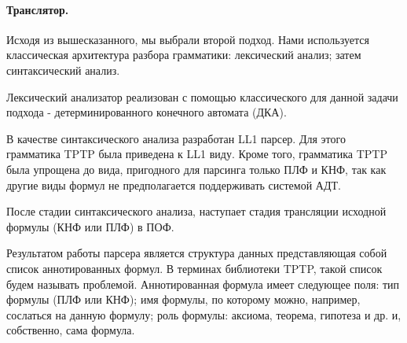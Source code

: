 \documentclass[a4paper]{jctart15b}
\begin{document}
\paragraph{Транслятор.}
Исходя из вышесказанного, мы выбрали второй подход. Нами используется классическая архитектура разбора грамматики: лексический анализ; затем синтаксический анализ. 

Лексический анализатор реализован с помощью классического для данной задачи подхода - детерминированного конечного автомата (ДКА).

В качестве синтаксического анализа разработан LL1 парсер. Для этого грамматика TPTP была приведена к LL1 виду. Кроме того, грамматика TPTP была упрощена до вида, пригодного для парсинга только ПЛФ и КНФ, так как другие виды формул не предполагается поддерживать системой АДТ.

После стадии синтаксического анализа, наступает стадия трансляции исходной формулы (КНФ или ПЛФ) в ПОФ. %

Результатом работы парсера является структура данных представляющая собой список аннотированных формул. В терминах библиотеки TPTP, такой список будем называть проблемой. Аннотированная формула имеет следующее поля: тип формулы (ПЛФ или КНФ); имя формулы, по которому можно, например, сослаться на данную формулу; роль формулы: аксиома, теорема, гипотеза и др. и, собственно, сама формула.



\end{document}
